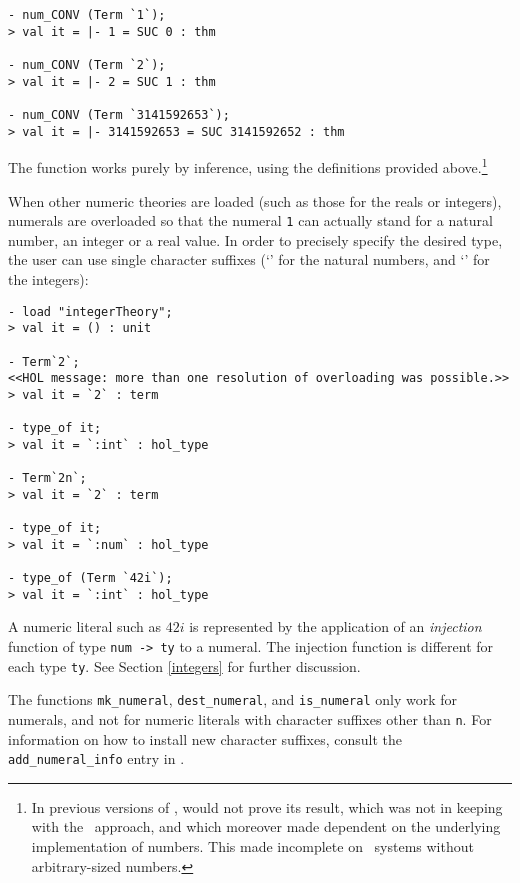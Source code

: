 {\begin{session}
\begin{verbatim}
- num_CONV (Term `1`);
> val it = |- 1 = SUC 0 : thm

- num_CONV (Term `2`);
> val it = |- 2 = SUC 1 : thm

- num_CONV (Term `3141592653`);
> val it = |- 3141592653 = SUC 3141592652 : thm
\end{verbatim}\end{session}

\noindent The  function works purely by inference, using
the definitions provided above.\footnote{In previous versions of \HOL,
 would not prove its result, which was not in keeping with
the \LCF\ approach, and which moreover made  dependent on
the underlying implementation of numbers. This made 
incomplete on \ML\ systems without arbitrary-sized numbers.}

When other numeric theories are loaded (such as those for the reals or
integers), numerals are overloaded so that the numeral {\small\verb+1+} can
actually stand for a natural number, an integer or a real value.  In
order to precisely specify the desired type, the user can use single
character suffixes (`' for the natural numbers, and `' for
the integers):

\begin{session}
\begin{verbatim}
- load "integerTheory";
> val it = () : unit

- Term`2`;
<<HOL message: more than one resolution of overloading was possible.>>
> val it = `2` : term

- type_of it;
> val it = `:int` : hol_type

- Term`2n`;
> val it = `2` : term

- type_of it;
> val it = `:num` : hol_type

- type_of (Term `42i`);
> val it = `:int` : hol_type
\end{verbatim}\end{session}

A numeric literal such as $42i$ is represented by the application of an
\emph{injection} function of type {\small\verb+num -> ty+} to a
numeral. The injection function is different for each type
{\small\verb+ty+}. See Section \ref{integers} for further discussion.

The functions {\small\verb+mk_numeral+},
{\small\verb+dest_numeral+}, and {\small\verb+is_numeral+} only work for
numerals, and not for numeric literals with character suffixes other
than {\small\verb+n+}. For information on how to install new character
suffixes, consult the {\small\verb+add_numeral_info+} entry in
\REFERENCE.

}
